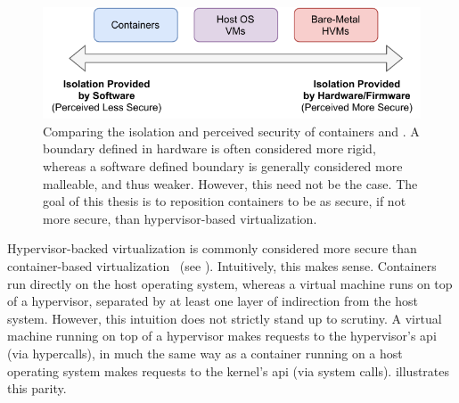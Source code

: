 \begin{figure}[!htb]
  \centering
  \includegraphics[width=0.8\linewidth]{figs/confinement-problem/security.pdf}
  \caption[Comparing the isolation and perceived security of containers and ]{
    Comparing the isolation and perceived security of containers and
    . A boundary defined in hardware is often considered more rigid,
    whereas a software defined boundary is generally considered more malleable, and thus
    weaker. However, this need not be the case. The goal of this thesis is to reposition
    containers to be as secure, if not more secure, than hypervisor-based virtualization.
  }%
  \label{fig:container-hvm-security}
\end{figure}

Hypervisor-backed virtualization is commonly considered more secure than
con\-tain\-er-based virtualization~\cite{sultan2019_container_security,
eder2016_hypervisor_container} (see ). Intuitively, this
makes sense.  Containers run directly on the host operating system, whereas a virtual
machine runs on top of a hypervisor, separated by at least one layer of indirection from
the host system.  However, this intuition does not strictly stand up to scrutiny.
A virtual machine running on top of a hypervisor makes requests to the hypervisor's
\gls{api} (via hypercalls), in much the same way as a container running on a host
operating system makes requests to the kernel's \gls{api} (via system calls).
 illustrates this parity.

